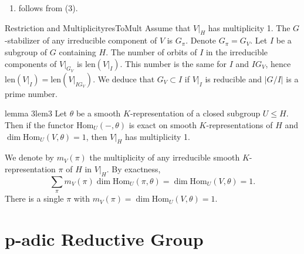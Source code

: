 \documentclass{article}
\newcommand{\subg}{\leqslant}
\begin{document}
\begin{Proof}
\begin{enumerate}
Hence \(\dim(\mathrm{End}_{J}(V_{\pi}|_J)) \ge 2\) and \(V_{\pi}|_J\) is reducible. By the hypothesis of multiplicity 1, \(V_{\pi}|_H\) is irreducible, hence \(V_{\pi}|_J\) is irreducible as \(H \subset J\). So \(\chi\) is trivial on \(G_{\pi}\).

The group \(G_{\pi}\) is a subgroup \(I\) of \(G\) containing \(H\) with \(\mathrm{len}(V|_I) = \mathrm{len}(V|_H)\). If \(I\) has this property, the restriction to \(H\) of any irreducible component on \(V|_I\) is irreducible, hence \(I\) is contained in \(G_{\pi}\).

\item follows from (3).
\end{enumerate}
\end{Proof}

\begin{titledBox}{Restriction and Multiplicity}{resToMult}
Assume that \(V|_H\) has multiplicity 1. The \(G\)-stabilizer of any irreducible component of \(V\) is \(G_{\pi}\). Denote \(G_{\pi} = G_V\). Let \(I\) be a subgroup of \(G\) containing \(H\). The number of orbits of \(I\) in the irreducible components of \(V|_{G_V}\) is \(\mathrm{len}(V|_I)\). This number is the same for \(I\) and \(IG_V\), hence \(\mathrm{len}(V|_I) = \mathrm{len}(V|_{IG_V})\). We deduce that \(G_V \subset I\) if \(V|_I\) is reducible and \(|G/I|\) is a prime number.

\end{titledBox}

\begin{lem}{lemma 3}{lem3}
Let \(\theta\) be a smooth \(K\)-representation of a closed subgroup \(U \subg H\). Then if the functor \(\mathrm{Hom}_U(-, \theta)\) is exact on smooth \(K\)-representations of \(H\) and \(\dim \mathrm{Hom}_U(V, \theta) = 1\), then \(V|_H\) has multiplicity 1.
\end{lem}
\begin{Proof}
We denote by \(m_V(\pi)\) the multiplicity of any irreducible smooth \(K\)-representation \(\pi\) of \(H\) in
\(V|_H\). By exactness,
\[
	\sum_{\pi} m_V(\pi) \dim \mathrm{Hom}_U(\pi, \theta) = \dim \mathrm{Hom}_U(V, \theta) = 1.
\]
There is a single \(\pi\) with \(m_V(\pi) = \dim \mathrm{Hom}_U(V, \theta) = 1\).
\end{Proof}

\section{p-adic Reductive Group}
\end{document}
